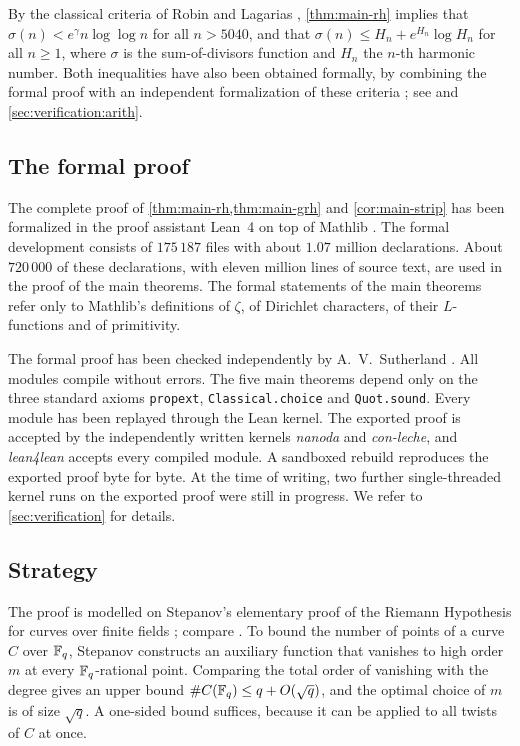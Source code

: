 By the classical criteria of Robin \cite{Robin1984} and Lagarias \cite{Lagarias2002},
\cref{thm:main-rh} implies that $\sigma(n)<e^{\gamma}n\log\log n$ for all $n>5040$, and that
$\sigma(n)\le H_n+e^{H_n}\log H_n$ for all $n\ge1$, where $\sigma$ is the sum-of-divisors function and
$H_n$ the $n$-th harmonic number. Both inequalities have also been obtained formally, by combining
the formal proof with an independent formalization of these criteria \cite{Robin1984Lean}; see
\cite{Sutherland2026} and \cref{sec:verification:arith}.

\subsection{The formal proof}\label{sec:intro:formal}

The complete proof of \cref{thm:main-rh,thm:main-grh} and \cref{cor:main-strip} has been formalized
in the proof assistant Lean~4 \cite{deMouraUllrich2021} on top of Mathlib \cite{LeanSource2026}.
The formal development consists of $175\,187$ files with about $1.07$ million declarations. About
$720\,000$ of these declarations, with eleven million lines of source text, are used in the proof of
the main theorems. The formal statements of the main theorems refer only to Mathlib's definitions of
$\zeta$, of Dirichlet characters, of their $L$-functions and of primitivity.

The formal proof has been checked independently by A.~V.~Sutherland \cite{Sutherland2026}. All
modules compile without errors. The five main theorems depend only on the three standard axioms
\texttt{propext}, \texttt{Classical.choice} and \texttt{Quot.sound}. Every module has been replayed
through the Lean kernel. The exported proof is accepted by the independently written kernels
\emph{nanoda} and \emph{con-leche}, and \emph{lean4lean} accepts every compiled module. A sandboxed
rebuild reproduces the exported proof byte for byte. At the time of writing, two further
single-threaded kernel runs on the exported proof were still in progress. We refer to
\cref{sec:verification} for details.

\subsection{Strategy}\label{sec:intro:strategy}

The proof is modelled on Stepanov's elementary proof of the Riemann Hypothesis for curves over finite
fields \cite{Stepanov1969,Bombieri1974}; compare \cite{Weil1948,Deligne1974}. To bound the number of
points of a curve $C$ over $\mathbb{F}_q$, Stepanov constructs an auxiliary function that vanishes to high
order $m$ at every $\mathbb{F}_q$-rational point. Comparing the total order of vanishing with the degree gives
an upper bound $\#C(\mathbb{F}_q)\le q+O(\sqrt q)$, and the optimal choice of $m$ is of size $\sqrt q$. A
one-sided bound suffices, because it can be applied to all twists of $C$ at once.

